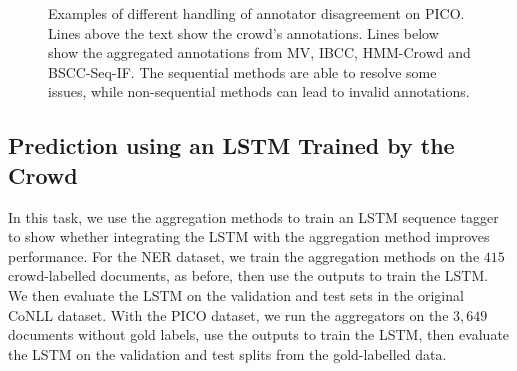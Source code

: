 \begin{figure}
{}
\caption{Examples of different handling of annotator disagreement on PICO. 
Lines above the text show the crowd's annotations. Lines below show the aggregated annotations from MV, IBCC, HMM-Crowd and BSCC-Seq-IF.
The sequential methods are able to resolve some issues, 
while non-sequential methods can lead to invalid annotations. }
\label{fig:disagreements}
\end{figure}

\subsection{Prediction using an LSTM Trained by the Crowd}\label{sec:task2}

In this task, we use the aggregation methods to train an LSTM sequence tagger \cite{lample2016}
to show whether integrating the LSTM with the aggregation method improves performance.
For the NER dataset, we train the aggregation methods on the $415$ crowd-labelled documents, as before,
then use the outputs to train the LSTM. We then evaluate the LSTM on the validation and test sets
in the original CoNLL dataset.
With the PICO dataset, we run the aggregators on the $3,649$ documents without gold labels, 
use the outputs to train the LSTM, then evaluate the LSTM on the validation and test splits from the gold-labelled data.



